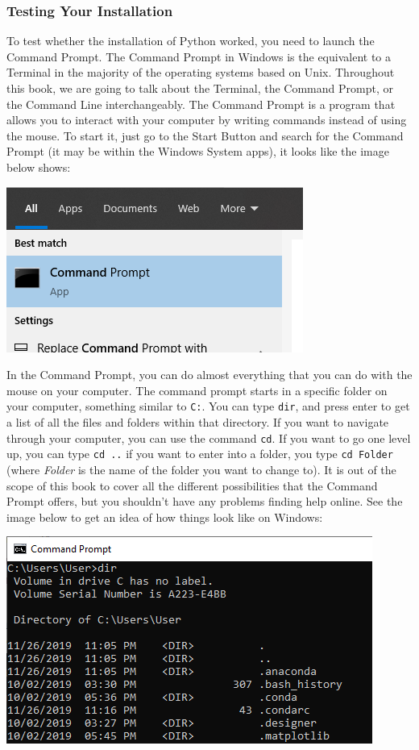 \subsubsection{Testing Your Installation}
To test whether the installation of Python worked, you need to launch the Command Prompt. The Command Prompt in Windows is the equivalent to a Terminal in the majority of the operating systems based on Unix. Throughout this book, we are going to talk about the Terminal, the Command Prompt, or the Command Line interchangeably. The Command Prompt is a program that allows you to interact with your computer by writing commands instead of using the mouse. To start it, just go to the Start Button and search for the Command Prompt (it may be within the Windows System apps), it looks like the image below shows:

\begin{center}
\includegraphics[width=.5\textwidth]{images/Chapter_02/CommandPrompt.png}
\end{center}

In the Command Prompt, you can do almost everything that you can do with the mouse on your computer. The command prompt starts in a specific folder on your computer, something similar to \texttt{C:\Users\User}. You can type \texttt{dir}, and press enter to get a list of all the files and folders within that directory. If you want to navigate through your computer, you can use the command \texttt{cd}. If you want to go one level up, you can type \texttt{cd ..} if you want to enter into a folder, you type \texttt{cd Folder} (where \textit{Folder} is the name of the folder you want to change to). It is out of the scope of this book to cover all the different possibilities that the Command Prompt offers, but you shouldn't have any problems finding help online. See the image below to get an idea of how things look like on Windows:

\begin{center}
\includegraphics[width=.5\textwidth]{images/Chapter_02/CommandPrompt03.png}
\end{center}


